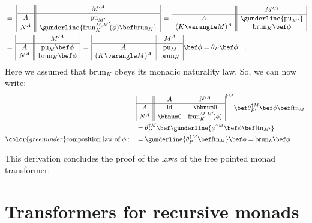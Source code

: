 \begin{align*}
 & =\,\,\begin{array}{|c||c|}
 & M^{\prime A}\\
\hline A & \text{pu}_{M^{\prime}}\\
N^{A} & \gunderline{\text{frun}_{K}^{M,M^{\prime}}\!(\phi)\bef\text{brun}_{K}}
\end{array}\,=\,\begin{array}{|c||c|}
 & M^{\prime A}\\
\hline A & \gunderline{\text{pu}_{M^{\prime}}}\\
(K\varangle M)^{A} & \text{brun}_{K}\bef\phi
\end{array}\\
 & =\,\begin{array}{|c||c|}
 & M^{\prime A}\\
\hline A & \text{pu}_{M}\bef\phi\\
N^{A} & \text{brun}_{K}\bef\phi
\end{array}\,=\,\begin{array}{|c||c|}
 & M^{A}\\
\hline A & \text{pu}_{M}\\
(K\varangle M)^{A} & \text{brun}_{K}
\end{array}\bef\phi=\theta_{P}\bef\phi\quad.
\end{align*}
Here we assumed that $\text{brun}_{K}$ obeys its monadic naturality
law. So, we can now write:
\begin{align*}
 & \begin{array}{|c||cc|}
 & A & N^{\prime A}\\
\hline A & \text{id} & \bbnum 0\\
N^{A} & \bbnum 0 & \text{frun}_{K}^{M,M^{\prime}}\!(\phi)
\end{array}^{\uparrow M}\bef\theta_{P^{\prime}}^{\uparrow M}\bef\phi\bef\text{ftn}_{M^{\prime}}\\
 & =\theta_{P}^{\uparrow M}\bef\gunderline{\phi^{\uparrow M}\bef\phi\bef\text{ftn}_{M^{\prime}}}\\
{\color{greenunder}\text{composition law of }\phi:}\quad & =\gunderline{\theta_{P}^{\uparrow M}\bef\text{ftn}_{M}}\bef\phi=\text{brun}_{L}\bef\phi\quad.
\end{align*}

This derivation concludes the proof of the laws of the free pointed
monad transformer.

\section{Transformers for recursive monads\label{sec:Transformers-for-recursive-monads}}

